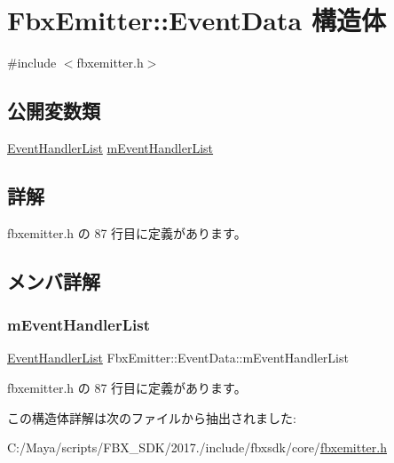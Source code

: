\hypertarget{struct_fbx_emitter_1_1_event_data}{}\section{Fbx\+Emitter\+:\+:Event\+Data 構造体}
\label{struct_fbx_emitter_1_1_event_data}


{\ttfamily \#include $<$fbxemitter.\+h$>$}

\subsection*{公開変数類}
\begin{DoxyCompactItemize}
\item 
\hyperlink{class_fbx_emitter_a9ac3cddf1a246e71957e4b7db6c08fc1}{Event\+Handler\+List} \hyperlink{struct_fbx_emitter_1_1_event_data_a0879b804afdfba87bbd758d5c78b7577}{m\+Event\+Handler\+List}
\end{DoxyCompactItemize}


\subsection{詳解}


 fbxemitter.\+h の 87 行目に定義があります。



\subsection{メンバ詳解}
\mbox{\label{struct_fbx_emitter_1_1_event_data_a0879b804afdfba87bbd758d5c78b7577}} 
\subsubsection{\texorpdfstring{m\+Event\+Handler\+List}{mEventHandlerList}}
{\footnotesize\ttfamily \hyperlink{class_fbx_emitter_a9ac3cddf1a246e71957e4b7db6c08fc1}{Event\+Handler\+List} Fbx\+Emitter\+::\+Event\+Data\+::m\+Event\+Handler\+List}



 fbxemitter.\+h の 87 行目に定義があります。



この構造体詳解は次のファイルから抽出されました\+:\begin{DoxyCompactItemize}
\item 
C\+:/\+Maya/scripts/\+F\+B\+X\+\_\+\+S\+D\+K/2017./include/fbxsdk/core/\hyperlink{fbxemitter_8h}{fbxemitter.\+h}\end{DoxyCompactItemize}
